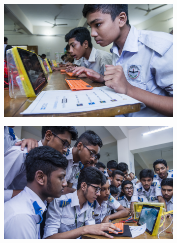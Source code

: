 \documentclass[12pt]{report} %
\begin{document}
\begin{figure}[t!]
   
        \begin{subfigure}[]{0.46\textwidth}
        \centering
        \includegraphics[width=1.0\textwidth]{_TMT4176}
    \end{subfigure}
    \begin{subfigure}[]{0.46\textwidth}
        \centering
        \includegraphics[width=1.0\textwidth]{_TMT7302}
    \end{subfigure}
    

\end{figure}
\end{document}
